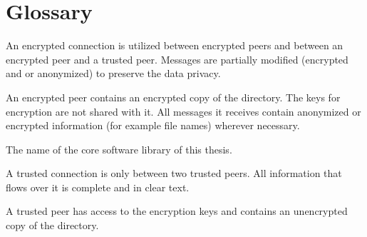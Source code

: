 \chapter{Glossary}
\label{chap:glossary}

\begin{description}[leftmargin=2em,style=nextline,noitemsep,nolistsep]
    \item[Encrypted Connection]
        An encrypted connection is utilized between encrypted peers and between an encrypted peer and a trusted peer.
        Messages are partially modified (encrypted and or anonymized) to preserve the data privacy.
    \item[Encrypted Peer]
        An encrypted peer contains an encrypted copy of the directory.
        The keys for encryption are not shared with it.
        All messages it receives contain anonymized or encrypted information (for example file names) wherever necessary.
    \item[Tinzenite]
        The name of the core software library of this thesis.
    \item[Trusted Connection]
        A trusted connection is only between two trusted peers.
        All information that flows over it is complete and in clear text.
    \item[Trusted Peer]
        A trusted peer has access to the encryption keys and contains an unencrypted copy of the directory.
\end{description}

